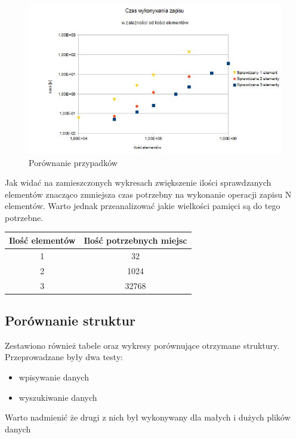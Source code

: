 \documentclass[12pt,a4paper,titlepage]{article}
\begin{document}
\begin{figure}[h]
\begin{center}
\includegraphics[scale=0.7]{porowanie_elementow.jpg}
\caption{Porównanie przypadków}
\end{center}
\end{figure}

Jak widać na zamieszczonych wykresach zwiększenie ilości sprawdzanych elementów znacząco zmniejsza czas potrzebny na wykonanie operacji zapisu N elementów. Warto jednak przeanalizować jakie wielkości pamięci są do tego potrzebne.

\begin{center}
\begin {tabular}{|c|c|}\hline
Ilość elementów& Ilość potrzebnych miejsc\\\hline 
1&32\\\hline 
2&1024\\\hline 
3&32768\\\hline 
\end{tabular}
\end {center}

\newpage
\newpage
\subsection{Porównanie struktur}
Zestawiono również tabele oraz wykresy porównujące otrzymane struktury. Przeprowadzane były dwa testy:
\begin{itemize}
\item wpisywanie danych
\item wyszukiwanie danych
\end{itemize}

Warto nadmienić że drugi z nich był wykonywany dla małych i dużych plików danych
\end{document}
